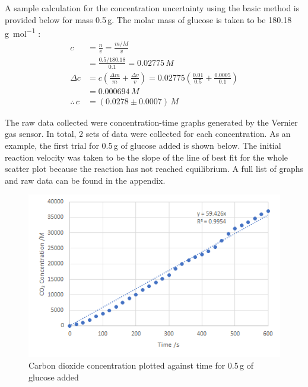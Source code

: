 \documentclass{article}
\begin{document}
A sample calculation for the concentration uncertainty using the basic method is provided below for mass 0.5\,\si{g}. The molar mass of glucose is taken to be 180.18\,\si{g.mol^{-1}} \parencite{ref}:
\begin{align*}
    c &= \frac{n}{v} = \frac{m/M}{v} \\
    &= \frac{0.5/180.18}{0.1} = 0.02775\,\si{M} \\  %
    \Delta c &= c\left(\frac{\Delta m}{m} + \frac{\Delta v}{v}\right) = 0.02775\left(\frac{0.01}{0.5} + \frac{0.0005}{0.1}\right) \\
    &= 0.000694\,\si{M} \\
    \therefore\,c &= (0.0278 \pm 0.0007)\,\si{M}
\end{align*}

The raw data collected were concentration-time graphs generated by the Vernier  gas sensor. In total, 2 sets of data were collected for each concentration. As an example, the first trial for 0.5\,\si{g} of glucose added is shown below. The initial reaction velocity was taken to be the slope of the line of best fit for the whole scatter plot because the reaction has not reached equilibrium. A full list of graphs and raw data can be found in the appendix.  %
\begin{figure}[H]
    \setcounter{figure}{1}
    \centering
    \includegraphics{figures/graph_02.png}
    \vspace*{-12pt}
    \caption{Carbon dioxide concentration plotted against time for 0.5\,\si{g} of glucose added}
    \label{fig:graph2}
\end{figure}
\end{document}
